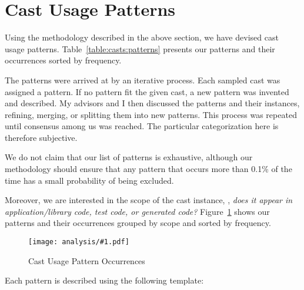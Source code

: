 \section{Cast Usage Patterns}\label{sec:casts:patterns}

Using the methodology described in the above section,
we have devised \nPattern{} cast usage patterns.
Table~\ref{table:casts:patterns} presents our patterns and their
occurrences sorted by frequency.




The patterns were arrived at by an iterative process.
Each sampled cast was assigned a pattern.
If no pattern fit the given cast,
a new pattern was invented and described.
My advisors and I then discussed the patterns and their instances,
refining, merging, or splitting them into new patterns.
This process was repeated until consensus among us was reached.
The particular categorization here is therefore subjective.

We do not claim that our list of patterns is exhaustive,
although our methodology should ensure that any pattern that occurs more
than 0.1\% of the time has a small probability of being excluded.

Moreover, we are interested in the scope of the cast instance,
\ie{}, \emph{does it appear in application/library code, test code, or generated code?}
Figure~\ref{fig:casts:patterns} shows our patterns and their occurrences grouped by scope and sorted by frequency.

\newcommand\plot[3]{
\begin{figure}[ht!]
\centering
\texttt{[image: analysis/\#1.pdf]}
\caption{#3} \label{#2}
\end{figure}
}

\plot{table-patterns}{fig:casts:patterns}{Cast Usage Pattern Occurrences}

Each pattern is described using the following template:

